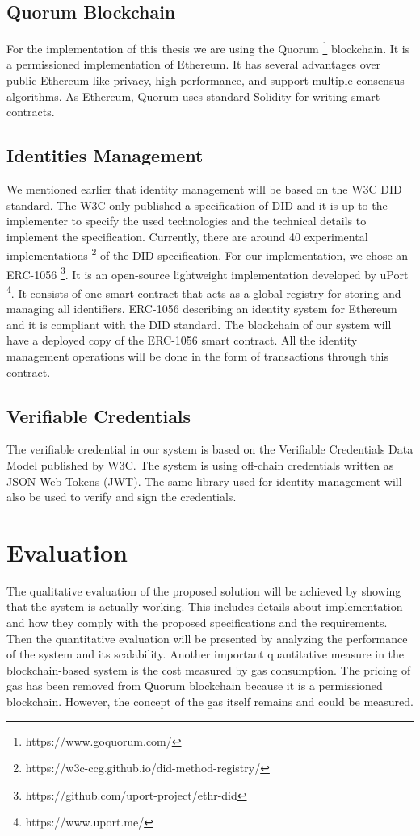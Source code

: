 \documentclass[runningheads]{llncs}
\begin{document}
\subsection{Quorum Blockchain}
For the implementation of this thesis we are using the Quorum \footnote{https://www.goquorum.com/} blockchain. It is a permissioned implementation of Ethereum. It has several advantages over public Ethereum like privacy, high performance, and support multiple consensus algorithms. As Ethereum, Quorum uses standard Solidity for writing smart contracts.

\subsection{Identities Management}
We mentioned earlier that identity management will be based on the W3C DID standard. The W3C only published a specification of DID and it is up to the implementer to specify the used technologies and the technical details to implement the specification. Currently, there are around 40 experimental implementations \footnote{https://w3c-ccg.github.io/did-method-registry/} of the DID specification. For our implementation, we chose an ERC-1056 \footnote{https://github.com/uport-project/ethr-did}. It is an open-source lightweight implementation developed by uPort \footnote{https://www.uport.me/}. It consists of one smart contract that acts as a global registry for storing and managing all identifiers. ERC-1056 describing an identity system for Ethereum and it is compliant with the DID standard. The blockchain of our system will have a deployed copy of the ERC-1056 smart contract. All the identity management operations will be done in the form of transactions through this contract.


\subsection{Verifiable Credentials}
The verifiable credential in our system is based on the Verifiable Credentials Data Model published by W3C. The system is using off-chain credentials written as JSON Web Tokens (JWT). The same library used for identity management will also be used to verify and sign the credentials.

\section{Evaluation}
The qualitative evaluation of the proposed solution will be achieved by showing that the system is actually working. This includes details about implementation and how they comply with the proposed specifications and the requirements. Then the quantitative evaluation will be presented by analyzing the performance of the system and its scalability. Another important quantitative measure in the blockchain-based system is the cost measured by gas consumption. The pricing of gas has been removed from Quorum blockchain because it is a permissioned blockchain. However, the concept of the gas itself remains and could be measured. 
\end{document}
